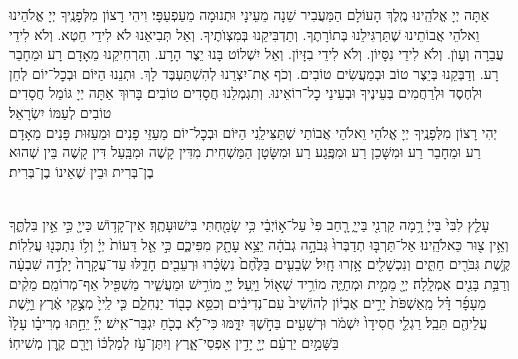 \documentclass[twoside, openany, parskip=half, 11pt]{book}
\begin{document}
אַתָּה יְיָ אֱלֹהֵֽינוּ מֶֽלֶךְ הָעוֹלָם הַמַּעֲבִיר שֵׁנָה מֵעֵינָי וּתְנוּמָה מֵעַפְעַפָּי׃ וִיהִי רָצוֹן מִלְּפָנֶֽיךָ יְיָ אֱלֹהֵינוּ וֵאלֹהֵי אֲבוֹתֵינוּ שֶׁתַּרְגִּילֵנוּ בְּתוֹרָתֶךָ. וְתַדְבִּיקֵנוּ בְּמִצְוׂתֶיךָ. וְאַל תְּבִיאֵנוּ לֹא לִידֵי חֵטְא. וְלֹא לִידֵי עֲבֵרָה וְעָוׂן. וְלֹא לִידֵי נִסָּיוֹן. וְלֹא לִידֵי בִזָּיוֹן. וְאַל יִשְׁלוֹט בָּנוּ יֵצֶר הָרָע. וְהַרְחִיקֵנוּ מֵאָדָם רָע וּמֵחָבֵר רָע. וְדַבְּקֵנוּ בְּיֵצֶר טוֹב וּבְמַעֲשִׂים טוֹבִים. וְכֹף אֶת־יִצְרֵנוּ לְהִשְׁתַּעְבֶּד לָךְ. וּתְנֵנוּ הַיּוֹם וּבְכׇל־יוֹם לְחֵן וּלְחֶסֶד וּלְרַחֲמִים בְּעֵינֶיךָ וּבְעֵינֵי כׇל־רוֹאֵינוּ. וְתִגְמְלֵנוּ חֲסָדִים טוֹבִים׃ בָּרוּךְ אַתָּה יְיָ גּוֹמֵל חֲסָדִים טוֹבִים לְעַמּוֹ יִשְׂרָאֵל׃\\
יְהִי רָצוֹן מִלְּפָנֶֽיךָ יְיָ אֱלֹהַי וֵאלֹהֵי אֲבוֹתַי שֶׁתַּצִּילֵֽנִי הַיּוֹם וּבְכׇל־יוֹם מֵעַזֵּי פָנִים וּמֵעַזּוּת פָּנִים מֵאָדָם רַע וּמֵחָבֵר רַע וּמִשָּׁכֵן רַע וּמִפֶּֽגַע רַע וּמִשָּׂטָן הַמַּשְׁחִית מִדִּין קָשֶׁה וּמִבַּֽעַל דִּין קָשֶׁה בֵּין שְׁהוּא בֶן־בְּרִית וּבֵין שֶׁאֵינוֹ בֶן־בְּרִית׃

\\
עָלַ֤ץ לִבִּי֙ בַּייָ֔ רָ֥מָה קַרְנִ֖י בַּייָ֑ רָ֤חַב פִּי֙ עַל־א֣וֹיְבַ֔י כִּ֥י שָׂמַ֖חְתִּי בִּישׁוּעָתֶֽךָ׃ אֵין־קָד֥וֹשׁ כַּייָ֖ כִּ֣י אֵ֣ין בִּלְתֶּ֑ךָ וְאֵ֥ין צ֖וּר כֵּאלֹהֵֽינוּ׃ אַל־תַּרְבּ֤וּ תְדַבְּרוּ֙ גְּבֹהָ֣ה גְבֹהָ֔ה יֵצֵ֥א עָתָ֖ק מִפִּיכֶ֑ם כִּ֣י אֵ֤ל דֵּעוֹת֙ יְיָ֔ וְל֥וֹ נִתְכְּנ֖וּ עֲלִלֽוֹת׃ קֶ֥שֶׁת גִּבֹּרִ֖ים חַתִּ֑ים וְנִכְשָׁלִ֖ים אָ֥זְרוּ חָֽיִל׃ שְׂבֵעִ֤ים בַּלֶּ֙חֶם֙ נִשְׂכָּ֔רוּ וּרְעֵבִ֖ים חָדֵ֑לּוּ עַד־עֲקָרָה֙ יָלְדָ֣ה שִׁבְעָ֔ה וְרַבַּ֥ת בָּנִ֖ים אֻמְלָֽלָה׃ יְיָ֖ מֵמִ֣ית וּמְחַיֶּ֑ה מוֹרִ֥יד שְׁא֖וֹל וַיָּֽעַל׃ יְיָ֖ מוֹרִ֣ישׁ וּמַעֲשִׁ֑יר מַשְׁפִּ֖יל אַף־מְרוֹמֵֽם׃ מֵקִ֨ים מֵעָפָ֜ר דָּ֗ל מֵֽאַשְׁפֹּת֙ יָרִ֣ים אֶבְי֔וֹן לְהוֹשִׁיב֙ עִם־נְדִיבִ֔ים וְכִסֵּ֥א כָב֖וֹד יַנְחִלֵ֑ם כִּ֤י לַֽייָ֙ מְצֻ֣קֵי אֶ֔רֶץ וַיָּ֥שֶׁת עֲלֵיהֶ֖ם תֵּבֵֽל׃ רַגְלֵ֤י חֲסִידָו֙ יִשְׁמֹ֔ר וּרְשָׁעִ֖ים בַּחֹ֣שֶׁךְ יִדָּ֑מּוּ כִּי־לֹ֥א בְכֹ֖חַ יִגְבַּר־אִֽישׁ׃ יְיָ֞ יֵחַ֣תּוּ מְרִיבָ֗ו עָלָו֙ בַּשָּׁמַ֣יִם יַרְעֵ֔ם יְיָ֖ יָדִ֣ין אַפְסֵי־אָ֑רֶץ וְיִתֶּן־עֹ֣ז לְמַלְכּ֔וֹ וְיָרֵ֖ם קֶ֥רֶן מְשִׁיחֽוֹ׃
\end{document}

